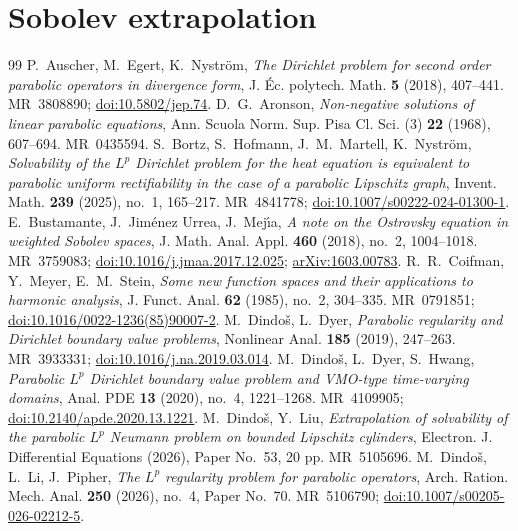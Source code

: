 \documentclass[10pt,a4paper]{amsart}
\numberwithin{equation}{section}
\begin{document}
\section{Sobolev extrapolation}\label{S.extrapolation}


\begin{thebibliography}{99}
 P.~Auscher, M.~Egert, K.~Nystr\"om, \emph{The Dirichlet problem for second order parabolic operators in divergence form}, J. \'Ec. polytech. Math. \textbf{5} (2018), 407--441. MR~3808890; \href{https://doi.org/10.5802/jep.74}{doi:10.5802/jep.74}.
 D.~G.~Aronson, \emph{Non-negative solutions of linear parabolic equations}, Ann. Scuola Norm. Sup. Pisa Cl. Sci. (3) \textbf{22} (1968), 607--694. MR~0435594.
 S.~Bortz, S.~Hofmann, J.~M.~Martell, K.~Nystr\"om, \emph{Solvability of the $L^{p}$ Dirichlet problem for the heat equation is equivalent to parabolic uniform rectifiability in the case of a parabolic Lipschitz graph}, Invent. Math. \textbf{239} (2025), no.~1, 165--217. MR~4841778; \href{https://doi.org/10.1007/s00222-024-01300-1}{doi:10.1007/s00222-024-01300-1}.
 E.~Bustamante, J.~Jim\'enez Urrea, J.~Mej\'{\i}a, \emph{A note on the Ostrovsky equation in weighted Sobolev spaces}, J. Math. Anal. Appl. \textbf{460} (2018), no.~2, 1004--1018. MR~3759083; \href{https://doi.org/10.1016/j.jmaa.2017.12.025}{doi:10.1016/j.jmaa.2017.12.025}; \href{https://arxiv.org/abs/1603.00783}{arXiv:1603.00783}.
 R.~R.~Coifman, Y.~Meyer, E.~M.~Stein, \emph{Some new function spaces and their applications to harmonic analysis}, J. Funct. Anal. \textbf{62} (1985), no.~2, 304--335. MR~0791851; \href{https://doi.org/10.1016/0022-1236(85)90007-2}{doi:10.1016/0022-1236(85)90007-2}.
 M.~Dindo\v s, L.~Dyer, \emph{Parabolic regularity and Dirichlet boundary value problems}, Nonlinear Anal. \textbf{185} (2019), 247--263. MR~3933331; \href{https://doi.org/10.1016/j.na.2019.03.014}{doi:10.1016/j.na.2019.03.014}.
 M.~Dindo\v s, L.~Dyer, S.~Hwang, \emph{Parabolic $L^p$ Dirichlet boundary value problem and VMO-type time-varying domains}, Anal. PDE \textbf{13} (2020), no.~4, 1221--1268. MR~4109905; \href{https://doi.org/10.2140/apde.2020.13.1221}{doi:10.2140/apde.2020.13.1221}.
 M.~Dindo\v s, Y.~Liu, \emph{Extrapolation of solvability of the parabolic $L^p$ Neumann problem on bounded Lipschitz cylinders}, Electron. J. Differential Equations (2026), Paper No.~53, 20 pp. MR~5105696.
 M.~Dindo\v s, L.~Li, J.~Pipher, \emph{The $L^p$ regularity problem for parabolic operators}, Arch. Ration. Mech. Anal. \textbf{250} (2026), no.~4, Paper No.~70. MR~5106790; \href{https://doi.org/10.1007/s00205-026-02212-5}{doi:10.1007/s00205-026-02212-5}.

\end{thebibliography}
\end{document}
